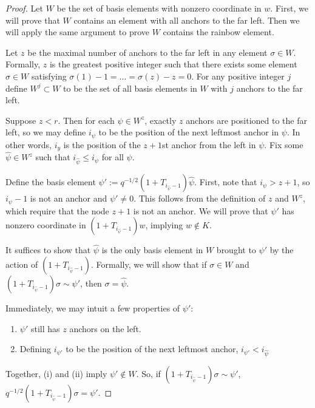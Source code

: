 \documentclass{amsart}
\begin{document}
\begin{proof}
	Let $W$ be the set of basis elements with nonzero coordinate in $w$. First, we will prove that $W$ contains an element with all anchors to the far left. Then we will apply the same argument to prove $W$ contains the rainbow element.
	
	Let $z$ be the maximal number of anchors to the far left in any element $\sigma\in W$. Formally, $z$ is the greatest positive integer such that there exists some element $\sigma\in W$ satisfying $\sigma(1)-1=...=\sigma(z)-z=0$. For any positive integer $j$ define $W^j\subset W$ to be the set of all basis elements in $W$ with $j$ anchors to the far left.
	
	Suppose $z<r$. Then for each $\psi\in W^z$, exactly $z$ anchors are positioned to the far left, so we may define $i_\psi$ to be the position of the next leftmost anchor in $\psi$. In other words, $i_y$ is the position of the $z+1$st anchor from the left in $\psi$. Fix some $\widehat{\psi}\in W^z$ such that $i_{\widehat{\psi}}\leq i_\psi$ for all $\psi$.
	
	Define the basis element $\psi':=q^{-1/2}(1+T_{i_{\widehat{\psi}}-1})\widehat{\psi}$. First, note that $i_\psi>z+1$, so $i_\psi-1$ is not an anchor and $\psi'\not=0$. This follows from the definition of $z$ and $W^z$, which require that the node $z+1$ is not an anchor. We will prove that $\psi'$ has nonzero coordinate in $(1+T_{i_{\widehat{\psi}}-1})w$, implying $w\not\in K$. 
	
	It suffices to show that $\widehat{\psi}$ is the only basis element in $W$ brought to $\psi'$ by the action of $(1+T_{i_{\widehat{\psi}}-1})$. Formally, we will show that if $\sigma\in W$ and $(1+T_{i_{\widehat{\psi}}-1})\sigma\sim \psi'$, then $\sigma=\widehat{\psi}$. 
	
	Immediately, we may intuit a few properties of $\psi'$:
	\begin{enumerate}[label={(\roman*)}]
		\item $\psi'$ still has $z$ anchors on the left.
		\item Defining $i_{\psi'}$ to be the position of the next leftmost anchor, $i_{\psi'}<i_{\widehat{\psi}}$
	\end{enumerate}
	
	Together, (i) and (ii) imply $\psi'\not\in W$. So, if $(1+T_{i_{\widehat{\psi}}-1})\sigma\sim \psi'$, $q^{-1/2}(1+T_{i_{\widehat{\psi}}-1})\sigma=\psi'$.
	

\end{proof}
\end{document}
